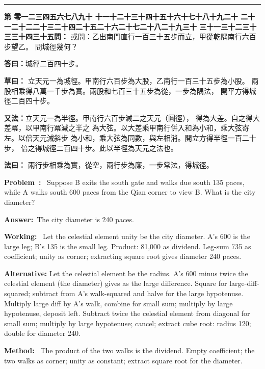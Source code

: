 \documentclass[9pt,a4paper]{article}
\newcounter{probnum}
\newcounter{overallnum}
\newcommand{\chnum}[1]{%
  \ifcase#1 零\or 一\or 二\or 三\or 四\or 五\or 六\or 七\or 八\or 九\or 十\or
    十一\or 十二\or 十三\or 十四\or 十五\or 十六\or 十七\or 十八\or 十九\or 二十\or
    二十一\or 二十二\or 二十三\or 二十四\or 二十五\or 二十六\or 二十七\or 二十八\or 二十九\or 三十\or
    三十一\or 三十二\or 三十三\or 三十四\or 三十五\fi}
\newcommand{\problem}[1]{\stepcounter{probnum}\stepcounter{overallnum}\par\noindent\textbf{\color{volcolor}第\chnum{\value{probnum}}問：}#1\par\vspace{0.15cm}}
\newcommand{\answer}[1]{\par\noindent\textbf{答曰：}#1\par\vspace{0.15cm}}
\newcommand{\working}[1]{\par\noindent\textbf{草曰：}#1\par\vspace{0.15cm}}
\newcommand{\method}[1]{\par\noindent\textbf{法曰：}#1\par\vspace{0.25cm}}
\newcommand{\eproblem}[1]{\par\noindent\textbf{\color{volcolor}Problem~\theoverallnum:}~#1\par\vspace{0.15cm}}
\newcommand{\eanswer}[1]{\par\noindent\textbf{Answer:}~#1\par\vspace{0.15cm}}
\newcommand{\eworking}[1]{\par\noindent\textbf{Working:}~#1\par\vspace{0.15cm}}
\newcommand{\emethod}[1]{\par\noindent\textbf{Method:}~#1\par\vspace{0.25cm}}
\newcommand{\tianyuan}[2]{\raisebox{-0.6ex}{\scriptsize$\begin{array}{c}#1\\\hline #2\end{array}$}}
\begin{document}
\vspace{0.15cm}
\noindent\rule{\textwidth}{0.2pt}
\vspace{0.15cm}

\noindent\begin{minipage}[t]{0.48\textwidth}
\problem{
或問：乙出南門直行一百三十五步而立，甲從乾隅南行六百步望乙。
問城徑幾何？
}

\answer{城徑二百四十步。}

\working{
立天元一為城徑。甲南行六百步為大股，乙南行一百三十五步為小股。
兩股相乘得八萬一千步為實。兩股和七百三十五步為從，一步為隅法，
開平方得城徑二百四十步。

\textbf{又法：}立天元一為半徑。甲南行六百步減二之天元（圓徑），
得\tianyuan{600}{2}為大差。自之得大差冪，以甲南行冪減之半之
為大弦。以大差乘甲南行併入和為小和，乘大弦寄左。以倍天元減斜步
為小和，乘大弦為同數，與左相消。開立方得半徑一百二十步，
倍之得城徑二百四十步。此以半徑為天元之法也。
}

\method{
兩行步相乘為實，從空，兩行步為廉，一步常法，得城徑。
}
\end{minipage}%
\hfill%
\begin{minipage}[t]{0.50\textwidth}
\eproblem{
Suppose B exits the south gate and walks due south 135 paces, while A walks
south 600 paces from the Qian corner to view B. What is the city diameter?
}

\eanswer{The city diameter is 240 paces.}

\eworking{
Let the celestial element unity be the city diameter. A's 600 is the large
leg; B's 135 is the small leg. Product: 81,000 as dividend. Leg-sum 735 as
coefficient; unity as corner; extracting square root gives diameter 240 paces.

\textbf{Alternative:} Let the celestial element be the radius. A's 600 minus
twice the celestial element (the diameter) gives \tianyuan{600}{2} as the
large difference. Square for large-diff-squared; subtract from A's walk-squared
and halve for the large hypotenuse. Multiply large diff by A's walk, combine
for small sum; multiply by large hypotenuse, deposit left. Subtract twice
the celestial element from diagonal for small sum; multiply by large hypotenuse;
cancel; extract cube root: radius 120; double for diameter 240.
}

\emethod{
The product of the two walks is the dividend. Empty coefficient; the two
walks as corner; unity as constant; extract square root for the diameter.
}
\end{minipage}
\vspace{0.15cm}
\end{document}
